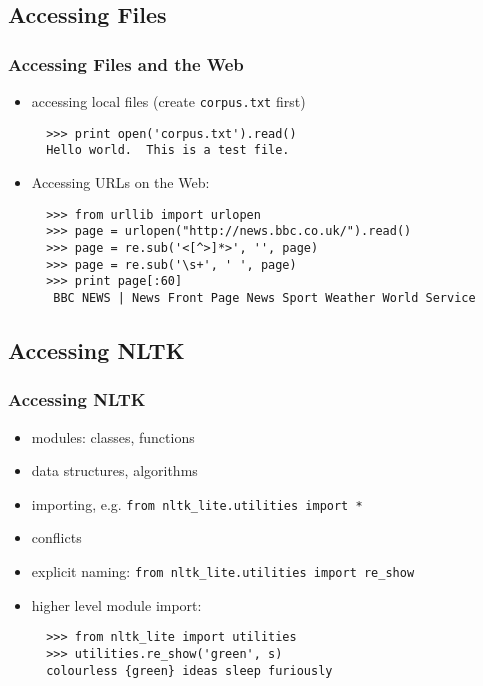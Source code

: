 \documentclass{beamer}             %
\begin{document}
\subsection{Accessing Files}

\begin{frame}[fragile]
\frametitle{Accessing Files and the Web}
\begin{itemize}
\item accessing local files (create \texttt{corpus.txt} first)

\begin{verbatim}
  >>> print open('corpus.txt').read() 
  Hello world.  This is a test file.
\end{verbatim}

\item Accessing URLs on the Web:

\begin{verbatim}
  >>> from urllib import urlopen
  >>> page = urlopen("http://news.bbc.co.uk/").read()
  >>> page = re.sub('<[^>]*>', '', page)
  >>> page = re.sub('\s+', ' ', page)
  >>> print page[:60]
   BBC NEWS | News Front Page News Sport Weather World Service
\end{verbatim}
\end{itemize}
\end{frame}

\subsection{Accessing NLTK}

\begin{frame}[fragile]
\frametitle{Accessing NLTK}

\begin{itemize}
\item modules: classes, functions
\item data structures, algorithms
\item importing, e.g. \texttt{from nltk\_lite.utilities import *}
\item conflicts
\item explicit naming: \texttt{from nltk\_lite.utilities import re\_show}
\item higher level module import:

\begin{verbatim}
  >>> from nltk_lite import utilities
  >>> utilities.re_show('green', s)
  colourless {green} ideas sleep furiously
\end{verbatim}
\end{itemize}
\end{frame}
\end{document}
